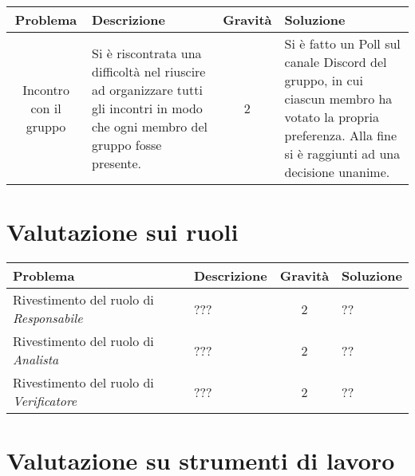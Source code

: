 \quad
\def\tabularxcolumn#1{m{#1}}
{
	
	\begin{center}
		\renewcommand{\arraystretch}{1.3}
		\begin{tabularx}{\textwidth}{|c|X|c|X}
			\hline
			\rowcolor{airforceblue}
			\textbf{Problema} & \textbf{Descrizione} & \textbf{Gravità} & \textbf{Soluzione}\\
			\hline
			Incontro con il gruppo & Si è riscontrata una difficoltà nel riuscire ad organizzare tutti gli incontri in modo che ogni membro del gruppo fosse presente. & 2 & Si è fatto un Poll sul canale Discord del gruppo, in cui ciascun membro ha votato la propria preferenza. Alla fine si è raggiunti ad una decisione unanime. \\
			\hline
		\end{tabularx}
	\end{center}

\section{Valutazione sui ruoli} \label{6.2}

\quad
\def\tabularxcolumn#1{m{#1}}
{
	
	\begin{center}
		\renewcommand{\arraystretch}{1.3}
		\begin{tabularx}{\textwidth}{|X|X|c|X}
			\hline
			\rowcolor{airforceblue}
			\textbf{Problema} & \textbf{Descrizione} & \textbf{Gravità} & \textbf{Soluzione}\\
			\hline
			Rivestimento del ruolo di \textit{Responsabile} & ??? & 2 & ?? \\
			\hline
			Rivestimento del ruolo di \textit{Analista} & ??? & 2 & ?? \\
			\hline
			Rivestimento del ruolo di \textit{Verificatore} & ??? & 2 & ?? \\
			\hline
		\end{tabularx}
	\end{center}

\section{Valutazione su strumenti di lavoro} \label{6.3}

}}
